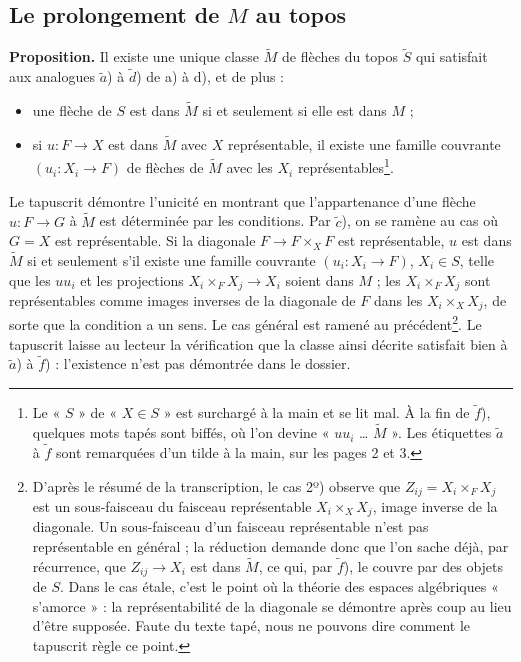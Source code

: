 \documentclass[11pt,a4paper]{article}
\begin{document}
\subsection*{Le prolongement de $M$ au topos}

\textbf{Proposition.} Il existe une unique classe $\widetilde{M}$ de flèches du
topos $\widetilde{S}$ qui satisfait aux analogues $\tilde{a}$) à $\tilde{d}$)
de a) à d), et de plus :
\begin{itemize}
  \item[$\tilde{e}$)] une flèche de $S$ est dans $\widetilde{M}$ si et
    seulement si elle est dans $M$ ;
  \item[$\tilde{f}$)] si $u : F \to X$ est dans $\widetilde{M}$ avec $X$
    représentable, il existe une famille couvrante $(u_i : X_i \to F)$ de
    flèches de $\widetilde{M}$ avec les $X_i$ représentables\footnote{Le
    « $S$ » de « $X \in S$ » est surchargé à la main et se lit mal. À la fin de
    $\tilde{f}$), quelques mots tapés sont biffés, où l'on devine
    « $uu_i$ … $\widetilde{M}$ ». Les étiquettes $\tilde{a}$ à $\tilde{f}$ sont
    remarquées d'un tilde à la main, sur les pages 2 et 3.}.
\end{itemize}

Le tapuscrit démontre l'unicité en montrant que l'appartenance d'une flèche
$u : F \to G$ à $\widetilde{M}$ est déterminée par les conditions. Par
$\tilde{c}$), on se ramène au cas où $G = X$ est représentable. Si la diagonale
$F \to F \times_X F$ est représentable, $u$ est dans $\widetilde{M}$ si et
seulement s'il existe une famille couvrante $(u_i : X_i \to F)$, $X_i \in S$,
telle que les $u u_i$ et les projections $X_i \times_F X_j \to X_i$ soient dans
$M$ ; les $X_i \times_F X_j$ sont représentables comme images inverses de la
diagonale de $F$ dans les $X_i \times_X X_j$, de sorte que la condition a un
sens. Le cas général est ramené au précédent\footnote{D'après le résumé de la
transcription, le cas 2º) observe que $Z_{ij} = X_i \times_F X_j$ est un
sous-faisceau du faisceau représentable $X_i \times_X X_j$, image inverse de la
diagonale. Un sous-faisceau d'un faisceau représentable n'est pas représentable
en général ; la réduction demande donc que l'on sache déjà, par récurrence, que
$Z_{ij} \to X_i$ est dans $\widetilde{M}$, ce qui, par $\tilde{f}$), le couvre
par des objets de $S$. Dans le cas étale, c'est le point où la théorie des
espaces algébriques « s'amorce » : la représentabilité de la diagonale se
démontre après coup au lieu d'être supposée. Faute du texte tapé, nous ne
pouvons dire comment le tapuscrit règle ce point.}. Le tapuscrit laisse au
lecteur la vérification que la classe ainsi décrite satisfait bien à
$\tilde{a}$) à $\tilde{f}$) : l'existence n'est pas démontrée dans le
dossier.
\end{document}
